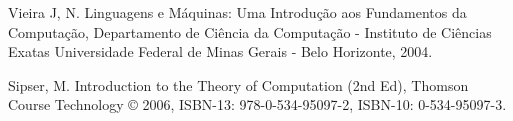 \documentclass[12pt, a4paper]{article}
\begin{document}
\pagebreak
\begin{thebibliography}{9}
 Vieira J, N. Linguagens e Máquinas: Uma Introdução aos Fundamentos da Computação, Departamento de Ciência da Computação - Instituto de Ciências Exatas Universidade Federal de Minas Gerais - Belo Horizonte, 2004.

 Sipser, M. Introduction to the Theory of Computation (2nd Ed), Thomson Course Technology © 2006, ISBN-13: 978-0-534-95097-2, ISBN-10: 0-534-95097-3.
\end{thebibliography}
\end{document}
